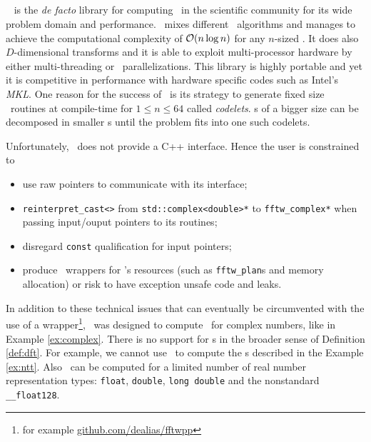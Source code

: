 \subsection{\fftw}
\fftw\ \cite{FFTW05} is the \emph{de facto} library for computing \dft\ in the scientific
community for its wide problem domain and performance.
\fftw\ mixes different \fft\ algorithms and manages to achieve the computational
complexity of $\mathcal{O}(n \log n)$ for any $n$-sized \dft. It does also
$D$-dimensional transforms and it is able to exploit multi-processor hardware by
either multi-threading or \mpi\ parallelizations. This library is highly portable
and yet it is competitive in performance with hardware specific codes such as
Intel's \emph{MKL}. One reason for the success of \fftw\ is its strategy to
generate fixed size \fft\ routines at compile-time for $1\le n\le 64$ called \emph{codelets}.
\dft{}s of a bigger size can be decomposed in smaller \dft{}s until the problem
fits into one such codelets.

Unfortunately, \fftw\ does not provide a C++ interface.
Hence the user is constrained to 
\begin{itemize}
    \item use raw pointers to communicate with its interface;
    \item \verb|reinterpret_cast<>| from
    \verb|std::complex<double>*| to \verb|fftw_complex*| when passing input/ouput
    pointers to its routines;
    \item disregard \verb|const| qualification for input pointers;
    \item produce \raii\ wrappers for \fftw's resources (such as
    \verb|fftw_plan|s and memory allocation) or risk to have exception unsafe
    code and leaks.
\end{itemize}
In addition to these technical issues that can eventually be circumvented with
the use of a wrapper\footnote{for example \url{github.com/dealias/fftwpp}},
\fftw\ was designed to compute \dft\ for
complex numbers, like in Example \ref{ex:complex}. 
There is no support for \dft{}s in the broader sense of Definition \ref{def:dft}.
For example, we cannot use \fftw\ to compute the \ntt{}s described in the
Example \ref{ex:ntt}. Also \dft\ can be computed for a limited number of real
number representation types: \verb|float|, \verb|double|, \verb|long double|
and the nonstandard \verb|__float128|.

